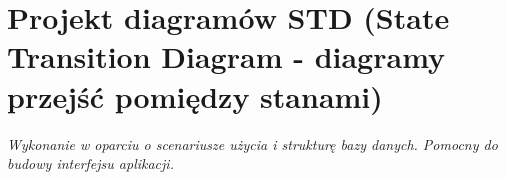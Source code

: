 \section{Projekt diagramów STD (State Transition Diagram - diagramy przejść pomiędzy
stanami)}

\textit{Wykonanie w oparciu o scenariusze użycia i strukturę bazy danych. Pomocny do
budowy interfejsu aplikacji.} \\

